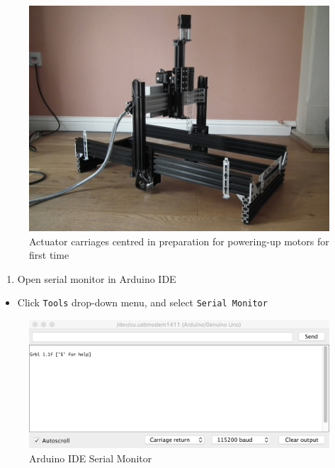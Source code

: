 \documentclass[]{book}
\providecommand{\tightlist}{%
  \setlength{\itemsep}{0pt}\setlength{\parskip}{0pt}}
\theoremstyle{definition}
\theoremstyle{definition}
\theoremstyle{remark}
\begin{document}
\begin{figure}

{\centering \includegraphics[width=0.75\linewidth]{images/actuator_carriages_centred} 

}

\caption{Actuator carriages centred in preparation for powering-up motors for first time}\label{fig:actuatorsCentred}
\end{figure}

\begin{enumerate}
\def\labelenumi{\arabic{enumi}.}
\tightlist
\item
  Open serial monitor in Arduino IDE
\end{enumerate}

\begin{itemize}
\tightlist
\item
  Click \texttt{Tools} drop-down menu, and select
  \texttt{Serial\ Monitor}
\end{itemize}

\begin{figure}

{\centering \includegraphics[width=0.75\linewidth]{images/Arduino_IDE_serial_monitor} 

}

\caption{Arduino IDE Serial Monitor}\label{fig:serialMonitor}
\end{figure}
\end{document}
